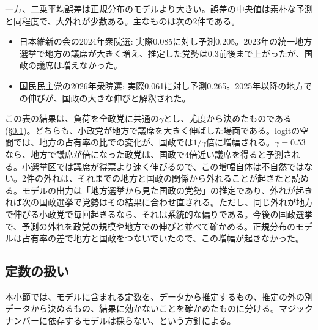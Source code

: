 \documentclass[a4paper,11pt]{ltjsarticle}
\begin{document}
一方、二乗平均誤差は正規分布のモデルより大きい。誤差の中央値は素朴な予測と同程度で、大外れが少数ある。主なものは次の2件である。
\begin{itemize}
  \item 日本維新の会の2024年衆院選: 実際0.085に対し予測0.205。2023年の統一地方選挙で地方の議席が大きく増え、推定した党勢は0.3前後まで上がったが、国政の議席は増えなかった。
  \item 国民民主党の2026年衆院選: 実際0.061に対し予測0.265。2025年以降の地方での伸びが、国政の大きな伸びと解釈された。
\end{itemize}
この表の結果は、負荷を全政党に共通の$\gamma$とし、尤度から決めたものである(\S\ref{sec:constants})。どちらも、小政党が地方で議席を大きく伸ばした場面である。logitの空間では、地方の占有率の比での変化が、国政では$1/\gamma$倍に増幅される。$\gamma=0.53$なら、地方で議席が倍になった政党は、国政で4倍近い議席を得ると予測される。小選挙区では議席が得票より速く伸びるので、この増幅自体は不自然ではない。2件の外れは、それまでの地方と国政の関係から外れることが起きたと読める。モデルの出力は「地方選挙から見た国政の党勢」の推定であり、外れが起きれば次の国政選挙で党勢はその結果に合わせ直される。ただし、同じ外れが地方で伸びる小政党で毎回起きるなら、それは系統的な偏りである。今後の国政選挙で、予測の外れを政党の規模や地方での伸びと並べて確かめる。正規分布のモデルは占有率の差で地方と国政をつないでいたので、この増幅が起きなかった。

\subsection{定数の扱い}
\label{sec:constants}

本小節では、モデルに含まれる定数を、データから推定するもの、推定の外の別データから決めるもの、結果に効かないことを確かめたものに分ける。マジックナンバーに依存するモデルは採らない、という方針による。
\end{document}
